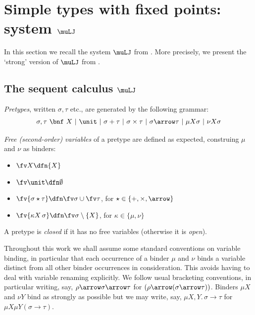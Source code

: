 

\section{Simple types with fixed points: system $\muLJ$}
\label{sec:muLJ-prelims}
In this section we recall the system $\muLJ$ from \cite{Clairambault09,Clairambault13interleaving}.
More precisely, we present the `strong' version of $\muLJ$ from \cite{Clairambault13interleaving}.



\subsection{The sequent calculus $\muLJ$}

\emph{Pretypes}, written $\sigma,\tau$ etc., are generated by the following grammar:
\[
\sigma,\tau \ \bnf\  X \ \vert \ \unit \ \vert \ \sigma + \tau \ \vert \ \sigma \times \tau \ \vert \ \sigma \arrow  \tau  \ \vert \ \mu X \sigma \ \vert \ \nu X \sigma      
\]


\emph{Free (second-order) variables} of a pretype are defined as expected, construing $\mu$ and $\nu$ as binders:
\begin{itemize}
    \item $\fv X \dfn \{X\}$
    \item $\fv \unit \dfn \emptyset$
    \item $\fv {\sigma \star \tau} \dfn \fv \sigma \cup \fv \tau$, for $\star \in \{+,\times,\arrow\}$
    \item $\fv{\kappa X \, \sigma} \dfn \fv \sigma \setminus \{X\}$, for $\kappa \in \{\mu,\nu\}$
\end{itemize}
A pretype is \emph{closed} if it has no free variables (otherwise it is \emph{open}).

Throughout this work we shall assume some standard conventions on variable binding, in particular that each occurrence of a binder $\mu$ and $\nu$ binds a variable distinct from all other binder occurrences in consideration.
This avoids having to deal with variable renaming explicitly.
We follow usual bracketing conventions, in particular writing, say, $\rho \arrow \sigma\arrow \tau$ for $(\rho \arrow (\sigma \arrow \tau))$.
Binders $\mu X $ and $\nu Y$ bind as strongly as possible but we may write, say, $\mu X, Y .\,  \sigma \to \tau$ for $\mu X \mu Y (\sigma \to \tau)$. 


